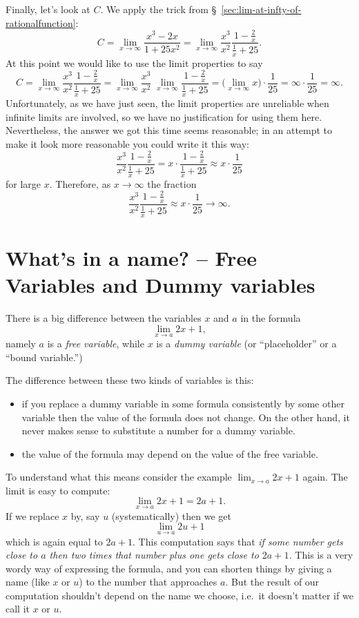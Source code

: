 Finally, let's look at $C$.  We apply the trick from
\S~\ref{sec:lim-at-infty-of-rationalfunction}:
\[
C = \lim_{x\to\infty}  \frac{x^3-2x} {1+25x^2}
=  \lim_{x\to\infty} \frac{x^3} {x^2}  \frac{1-\frac2x} {\frac1x+25}.
\]
At this point we would like to use the limit properties to say
\[
C =  \lim_{x\to\infty} \frac{x^3} {x^2}  \frac{1-\frac2x} {\frac1x+25}
= \lim_{x\to\infty} \frac{x^3} {x^2}\; \lim_{x\to\infty}
\frac{1-\frac2x} {\frac1x+25}
=\bigl(\lim_{x\to\infty} x\bigr) \cdot \frac{1} {25}
=\infty \cdot \frac{1} {25}
=\infty.
\]
Unfortunately, as we have just seen, the limit properties are
unreliable when infinite limits are involved, so we have no
justification for using them here.  Nevertheless, the answer we got
this time seems reasonable; in an attempt to make it look more
reasonable you could write it this way:
\[
\frac{x^3} {x^2}  \frac{1-\frac2x} {\frac1x+25}
=x\cdot \frac{1-\frac2x}{\frac1x+25}
\approx x \cdot \frac{1} {25}
\]
for large $x$.  Therefore, as $x\to\infty$ the fraction
\[
\frac{x^3} {x^2}  \frac{1-\frac2x} {\frac1x+25}
\approx x \cdot \frac{1} {25}
\to\infty.
\]

\section{What's in a name? -- Free Variables and Dummy variables}
\label{sec:free-versus-dummy-variables}%
There is a big difference between the variables $x$ and $a$ in the formula
\[
\lim_{x\to a} 2x+1,
\]
namely $a$ is a \emph{free variable}, while $x$ is a \emph{dummy variable}
(or ``placeholder'' or a ``bound variable.'')

The difference between these two kinds of variables is this:
\begin{itemize}
\item if you replace a dummy variable in some formula consistently by some
  other variable then the value of the formula does not change.  On the
  other hand, it never makes sense to substitute a number for a dummy
  variable.

\item the value of the formula may depend on the value of the free
  variable.
\end{itemize}
To understand what this means consider the example $\lim_{x\to a}2x+1$
again.  The limit is easy to compute:
\[
\lim_{x\to a}2x+1 = 2a+1.
\]
If we replace $x$ by, say $u$ (systematically) then we get
\[
\lim_{u\to a} 2u+1
\]
which is again equal to $2a+1$.  This computation says that \textit{if some
  number gets close to $a$ then two times that number plus one gets close
  to $2a+1$.}  This is a very wordy way of expressing the formula, and you
can shorten things by giving a name (like $x$ or $u$) to the number that
approaches $a$.  But the result of our computation shouldn't depend on the
name we choose, i.e.\ it doesn't matter if we call it $x$ or $u$.

